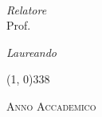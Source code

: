 \documentclass[a4paper,11pt]{article}
\begin{document}
\begin{titlepage}
\begin{center}
\begin{large}
\textsl{\myDegree}\\
\end{large}

\vspace{40pt} 

\begin{large}
\begin{flushleft}
\textit{Relatore}\\ 
\vspace{5pt} 
Prof. \myProf
\end{flushleft}

\vspace{0pt} 

\begin{flushright}
\textit{Laureando}\\ 
\vspace{5pt} 
\myName
\end{flushright}
\end{large}

\vspace{40pt}

\line(1, 0){338} \\
\begin{normalsize}
\textsc{Anno Accademico \myAA}
\end{normalsize}

\end{center}
\end{titlepage} 

\newpage

\end{document}
